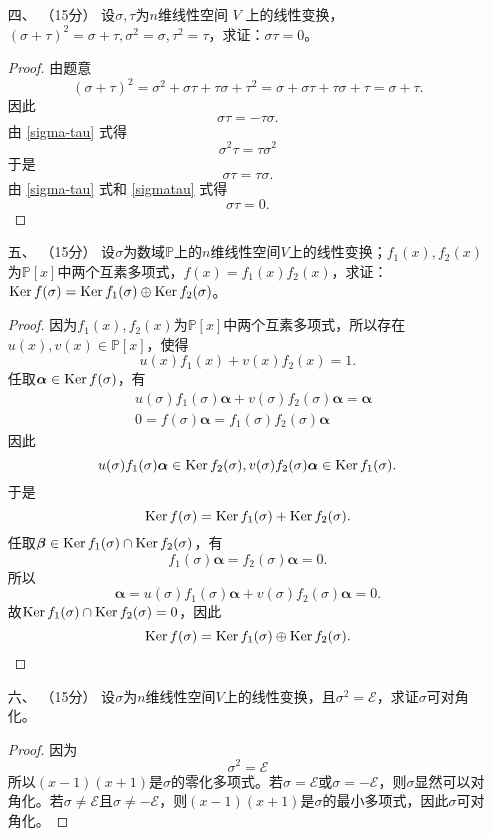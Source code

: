 \begin{enumerate}[1~]
\item[四、]（15分）
设$\sigma , \tau$为$n$维线性空间 $V$ 上的线性变换，$( \sigma + \tau ) ^ { 2 } = \sigma + \tau , \sigma ^ { 2 } = \sigma , \tau ^ { 2 } = \tau$，求证：$\sigma \tau = 0$。
\begin{proof}
由题意\[
(\sigma+\tau)^2=\sigma^2+\sigma\tau+\tau\sigma+\tau^2=\sigma+\sigma\tau+\tau\sigma+\tau=\sigma+\tau.
\]
因此
\begin{equation}\label{sigma-tau}
\sigma\tau=-\tau\sigma.
\end{equation}
由 \eqref{sigma-tau} 式得\[
\sigma^2\tau=\tau\sigma^2
\]
于是\begin{equation}\label{sigmatau}
\sigma\tau=\tau\sigma.
\end{equation}
由 \eqref{sigma-tau} 式和 \eqref{sigmatau} 式得\[
\sigma\tau=0.
\]
\end{proof}

\item[五、]（15分）
设$\sigma$为数域$\mathbb{P}$上的$n$维线性空间$V$上的线性变换；$f _ { 1 } ( x ) ,  f _ { 2 } ( x )$为$\mathbb{P}[x]$中两个互素多项式，$f ( x ) = f _ { 1 } ( x ) f _ { 2 } ( x )$，求证：$\operatorname{Ker} f ( \sigma ) = \operatorname { \operatorname{Ker} } f _ { 1 } ( \sigma ) \oplus \operatorname { \operatorname{Ker} } f _ { 2 } ( \sigma )$。
\begin{proof}
因为$f _ { 1 } ( x ) ,  f _ { 2 } ( x )$为$\mathbb{P}[x]$中两个互素多项式，所以存在$u(x), v(x)\in \mathbb{P}[x]$，使得\[
u(x)f_1(x)+v(x)f_2(x)=1.
\]
任取$\boldsymbol{\alpha}\in \operatorname{Ker} f(\sigma)$，有\begin{align*}
&u(\sigma)f_1(\sigma)\boldsymbol{\alpha}+v(\sigma)f_2(\sigma)\boldsymbol{\alpha}=\boldsymbol{\alpha}\\
&0=f(\sigma)\boldsymbol{\alpha}=f_1(\sigma)f_2(\sigma)\boldsymbol{\alpha}
\end{align*}
因此\[
u(\sigma)f_1(\sigma)\boldsymbol{\alpha}\in\operatorname{Ker} f_2(\sigma), v(\sigma)f_2(\sigma)\boldsymbol{\alpha}\in\operatorname{Ker} f_1(\sigma).
\]
于是\[
\operatorname{Ker} f(\sigma)=\operatorname{Ker} f_1(\sigma)+\operatorname{Ker} f_2(\sigma).
\]
任取$\boldsymbol{\beta}\in\operatorname{Ker} f_1(\sigma)\cap\operatorname{Ker} f_2(\sigma)$，有\[
f_1(\sigma)\boldsymbol{\alpha}=f_2(\sigma)\boldsymbol{\alpha}=0.
\]
所以\[
\boldsymbol{\alpha}=u(\sigma)f_1(\sigma)\boldsymbol{\alpha}+v(\sigma)f_2(\sigma)\boldsymbol{\alpha}=0.
\]
故$\operatorname{Ker} f_1(\sigma)\cap\operatorname{Ker} f_2(\sigma)=0$，因此\[
\operatorname{Ker} f(\sigma)=\operatorname{Ker} f_1(\sigma)\oplus \operatorname{Ker} f_2(\sigma).
\]
\end{proof}

\item[六、]（15分）
设$\sigma$为$n$维线性空间$V$上的线性变换，且$\sigma ^ { 2 } = \mathscr{E}$，求证$\sigma$可对角化。
\begin{proof}
因为\[
\sigma ^ { 2 } = \mathscr{E}
\]
所以$(x-1)(x+1)$是$\sigma$的零化多项式。若$\sigma=\mathscr{E}$或$\sigma=-\mathscr{E}$，则$\sigma$显然可以对角化。若$\sigma\ne\mathscr{E}$且$\sigma\ne-\mathscr{E}$，则$(x-1)(x+1)$是$\sigma$的最小多项式，因此$\sigma$可对角化。
\end{proof}


\end{enumerate}
